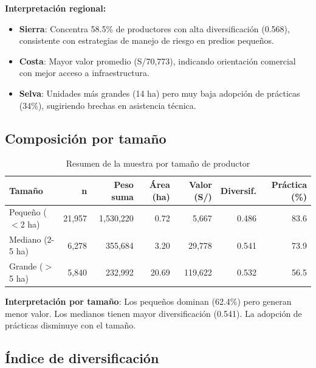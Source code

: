 \documentclass[11pt,a4paper]{article}
\begin{document}
\textbf{Interpretación regional:}
\begin{itemize}
    \item \textbf{Sierra}: Concentra 58.5\% de productores con alta diversificación (0.568), consistente con estrategias de manejo de riesgo en predios pequeños.
    \item \textbf{Costa}: Mayor valor promedio (S/70,773), indicando orientación comercial con mejor acceso a infraestructura.
    \item \textbf{Selva}: Unidades más grandes (14 ha) pero muy baja adopción de prácticas (34\%), sugiriendo brechas en asistencia técnica.
\end{itemize}

\subsection{Composición por tamaño}

\begin{table}[H]
\centering
\caption{Resumen de la muestra por tamaño de productor}
\label{tab:sample_size}
\begin{threeparttable}
\small
\begin{tabular}{lrrrrrr}
\toprule
\textbf{Tamaño} & \textbf{n} & \textbf{Peso suma} & \textbf{Área (ha)} & \textbf{Valor (S/)} & \textbf{Diversif.} & \textbf{Práctica (\%)} \\
\midrule
Pequeño ($<$2 ha) & 21,957 & 1,530,220 & 0.72 & 5,667 & 0.486 & 83.6 \\
Mediano (2-5 ha) & 6,278 & 355,684 & 3.20 & 29,778 & 0.541 & 73.9 \\
Grande ($>$5 ha) & 5,840 & 232,992 & 20.69 & 119,622 & 0.532 & 56.5 \\
\bottomrule
\end{tabular}
\end{threeparttable}
\end{table}

\textbf{Interpretación por tamaño}: Los pequeños dominan (62.4\%) pero generan menor valor. Los medianos tienen mayor diversificación (0.541). La adopción de prácticas disminuye con el tamaño.

\subsection{Índice de diversificación}
\end{document}
